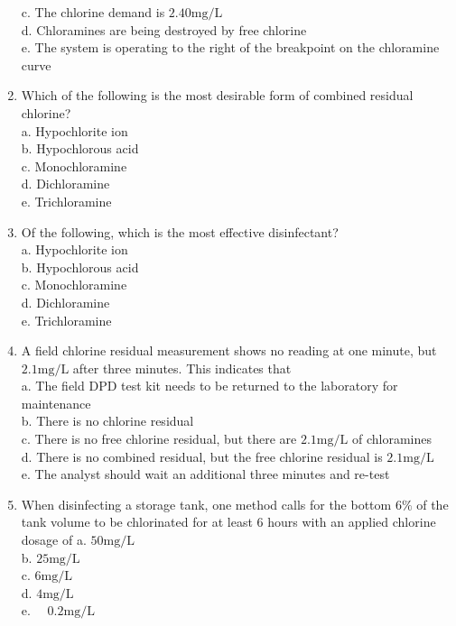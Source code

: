 \begin{enumerate}[1.]
c. The chlorine demand is $2.40 \mathrm{mg} / \mathrm{L}$\\
d. Chloramines are being destroyed by free chlorine\\
e. The system is operating to the right of the breakpoint on the chloramine curve\\
\item Which of the following is the most desirable form of combined residual chlorine?\\
a. Hypochlorite ion\\
b. Hypochlorous acid\\
c. Monochloramine\\
d. Dichloramine\\
e. Trichloramine\\
\item Of the following, which is the most effective disinfectant?\\
a. Hypochlorite ion\\
b. Hypochlorous acid\\
c. Monochloramine\\
d. Dichloramine\\
e. Trichloramine\\
\item A field chlorine residual measurement shows no reading at one minute, but $2.1 \mathrm{mg} / \mathrm{L}$ after three minutes. This indicates that\\
a. The field DPD test kit needs to be returned to the laboratory for maintenance\\
b. There is no chlorine residual\\
c. There is no free chlorine residual, but there are $2.1 \mathrm{mg} / \mathrm{L}$ of chloramines\\
d. There is no combined residual, but the free chlorine residual is $2.1 \mathrm{mg} / \mathrm{L}$\\
e. The analyst should wait an additional three minutes and re-test\\
\item When disinfecting a storage tank, one method calls for the bottom $6 \%$ of the tank volume to be chlorinated for at least 6 hours with an applied chlorine dosage of a. $50 \mathrm{mg} / \mathrm{L}$\\
b. $25 \mathrm{mg} / \mathrm{L}$\\
c. $6 \mathrm{mg} / \mathrm{L}$\\
d. $4 \mathrm{mg} / \mathrm{L}$\\
e. $\quad 0.2 \mathrm{mg} / \mathrm{L}$\\

\end{enumerate}
